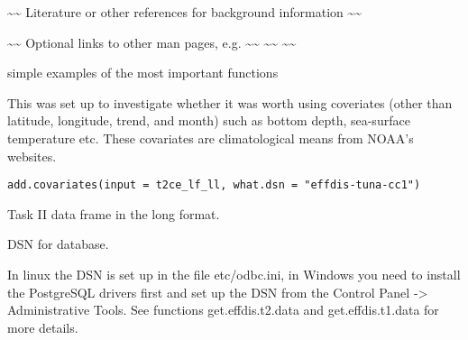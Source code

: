 \documentclass[letterpaper]{book}
\begin{document}
%
\begin{References}\relax
\textasciitilde{}\textasciitilde{} Literature or other references for background information \textasciitilde{}\textasciitilde{}
\end{References}
%
\begin{SeeAlso}\relax
\textasciitilde{}\textasciitilde{} Optional links to other man pages, e.g. \textasciitilde{}\textasciitilde{}
\textasciitilde{}\textasciitilde{}  \textasciitilde{}\textasciitilde{}
\end{SeeAlso}
%
\begin{Examples}
\begin{ExampleCode}
 simple examples of the most important functions 
\end{ExampleCode}
\end{Examples}
%
\begin{Description}\relax

This was set up to investigate whether it was worth using coveriates (other than latitude, longitude, trend, and month) such as bottom depth, sea-surface temperature etc. These covariates are climatological means from NOAA's websites.


\end{Description}
%
\begin{Usage}
\begin{verbatim}
add.covariates(input = t2ce_lf_ll, what.dsn = "effdis-tuna-cc1")
\end{verbatim}
\end{Usage}
%
\begin{Arguments}
\begin{ldescription}
\item[\code{input}] 
Task II data frame in the long format.

\item[\code{what.dsn}] 
DSN for database.

\end{ldescription}
\end{Arguments}
%
\begin{Details}\relax
In linux the DSN is set up in the file etc/odbc.ini, in Windows you need to install the PostgreSQL drivers first and set up the DSN from the Control Panel -> Administrative Tools. See functions get.effdis.t2.data and get.effdis.t1.data for more details.

\end{Details}
\end{document}
